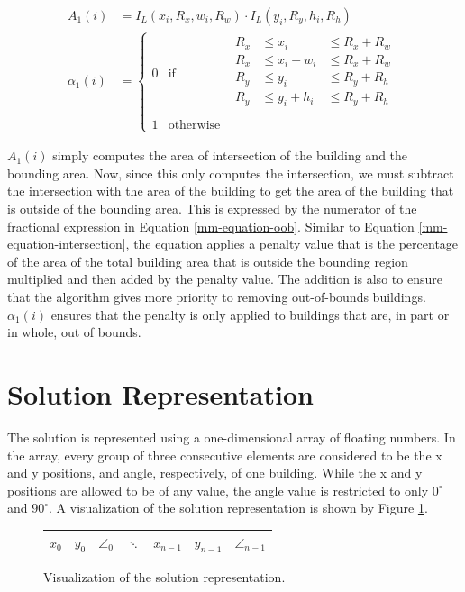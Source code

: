 \begin{align}
	A_{1}(i) &= I_{L}(x_{i}, R_{x}, w_{i}, R_{w})
	\cdot I_{L}(y_{i}, R_{y}, h_{i}, R_{h}) \\
	\alpha_{1}(i) &=
	\left\{
	\begin{matrix}
		0 & \text{if} &
		\begin{aligned}
			R_{x} &\leq x_{i} &\leq R_{x} + R_{w} \\
			R_{x} &\leq x_{i} + w_{i} &\leq R_{x} + R_{w} \\
			R_{y} &\leq y_{i} &\leq R_{y} + R_{h} \\
			R_{y} &\leq y_{i} + h_{i} &\leq R_{y} + R_{h} \\
		\end{aligned} \\		
		1 & \text{otherwise}
	\end{matrix}\right.
\end{align}

$A_{1}(i)$ simply computes the area of intersection of the building and the bounding area. Now, since this only computes the intersection, we must subtract the intersection with the area of the building to get the area of the building that is outside of the bounding area. This is expressed by the numerator of the fractional expression in Equation \ref{mm-equation-oob}. Similar to Equation \ref{mm-equation-intersection}, the equation applies a penalty value that is the percentage of the area of the total building area that is outside the bounding region multiplied and then added by the penalty value. The addition is also to ensure that the algorithm gives more priority to removing out-of-bounds buildings. $\alpha_{1}(i)$ ensures that the penalty is only applied to buildings that are, in part or in whole, out of bounds.

\section{Solution Representation}
The solution is represented using a one-dimensional array of floating numbers. In the array, every group of three consecutive elements are considered to be the x and y positions, and angle, respectively, of one building. While the x and y positions are allowed to be of any value, the angle value is restricted to only $0^{\circ}$ and $90^{\circ}$. A visualization of the solution representation is shown by Figure \ref{solution-repr-viz}.

\begin{figure}
	\begin{center}
		\begin{tabular}{| c | c | c | c | c | c | c |}
			\hline
			$x_{0}$ & $y_{0}$ & $\angle_{0}$ & $\ddots$ & $x_{n - 1}$ & $y_{n - 1}$ & $\angle_{n - 1}$ \\
			\hline
		\end{tabular}
	\end{center}
	\caption{Visualization of the solution representation.}
	\label{solution-repr-viz}
\end{figure}

